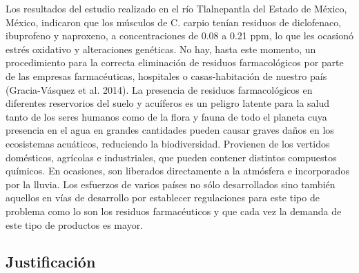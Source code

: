 Los resultados del estudio realizado en el río Tlalnepantla del Estado de México, México, indicaron que los músculos de C. carpio tenían residuos de diclofenaco, ibuprofeno y naproxeno, a concentraciones de 0.08 a 0.21 ppm, lo que les ocasionó estrés oxidativo y alteraciones genéticas. No hay, hasta este momento, un procedimiento para la correcta eliminación de residuos farmacológicos por parte de las empresas farmacéuticas, hospitales o casas-habitación de nuestro país (Gracia-Vásquez et al. 2014). La presencia de residuos farmacológicos en diferentes reservorios del suelo y acuíferos es un peligro latente para la salud tanto de los seres humanos como de la flora y fauna de todo el planeta cuya presencia en el agua en grandes cantidades pueden causar graves daños en los ecosistemas acuáticos, reduciendo la biodiversidad. Provienen de los vertidos domésticos, agrícolas e industriales, que pueden contener distintos compuestos químicos. En ocasiones, son liberados directamente a la atmósfera e incorporados por la lluvia. Los esfuerzos de varios países no sólo desarrollados sino también aquellos en vías de desarrollo por establecer regulaciones para este tipo de problema como lo son los residuos farmacéuticos y que cada vez la demanda de este tipo de productos es mayor.
\subsection{Justificación}
